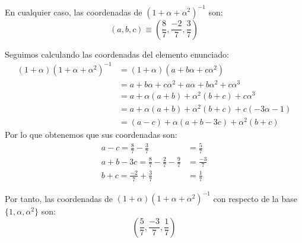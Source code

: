 \begin{ejercicio}
    En cualquier caso, las coordenadas de ${(1+\alpha+\alpha^2)}^{-1}$ son:
    \begin{equation*}
        (a,b,c)\equiv \left(\frac{8}{7}, \frac{-2}{7}, \frac{3}{7}\right)
    \end{equation*}

    Seguimos calculando las coordenadas del elemento enunciado:
    \begin{align*}
        (1+\alpha){(1+\alpha+\alpha^2)}^{-1} &= (1+\alpha)(a+b\alpha + c\alpha^2) \\
                                             &= a + b\alpha + c\alpha^2 + a \alpha + b\alpha^2 + c\alpha^3 \\
                                             &= a + \alpha(a+b) + \alpha^2(b+c) + c\alpha^3 \\
                                             &= a + \alpha(a+b) + \alpha^2(b+c) + c(-3\alpha-1) \\
                                             &= (a-c) + \alpha(a+b-3c) + \alpha^2 (b+c)
    \end{align*}
    Por lo que obtenemos que sus coordenadas son:
    \begin{align*}
        a-c = \frac{8}{7}-\frac{3}{7} &= \frac{5}{7} \\
        a+b-3c = \frac{8}{7} - \frac{2}{7} - \frac{9}{7} &= \frac{-3}{7} \\
        b+c = \frac{-2}{7} + \frac{3}{7} &= \frac{1}{7}
    \end{align*}

    Por tanto, las coordenadas de $(1+\alpha){(1+\alpha+\alpha^2)}^{-1}$ con respecto de la base $\{1,\alpha,\alpha^2\}$ son:
    \begin{equation*}
        \left(\frac{5}{7}, \frac{-3}{7}, \frac{1}{7}\right)
    \end{equation*}
\end{ejercicio}


